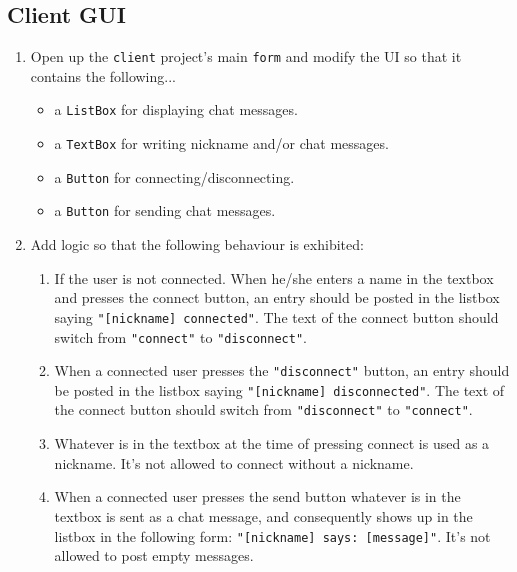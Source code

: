 \documentclass{article}
\newcounter{stepcounter}
\newenvironment{steps}{ 
  \begin{enumerate}[label=\color{red}Step \theenumi)]
    \setcounter{enumi}{\value{stepcounter}}
}{
  \setcounter{stepcounter}{\value{enumi}}
  \end{enumerate}
}
\begin{document}
\subsection{Client GUI}
 \begin{steps}
\item Open up the \texttt{client} project's main \texttt{form} and modify the UI so that it contains the following...
  \begin{itemize}
  \item a \texttt{ListBox} for displaying chat messages.
  \item a \texttt{TextBox} for writing nickname and/or chat messages.
  \item a \texttt{Button} for connecting/disconnecting.
  \item a \texttt{Button} for sending chat messages.
  \end{itemize}
\item Add logic so that the following behaviour is exhibited:
  \begin{enumerate}
  \item If the user is not connected. When he/she enters a name in the textbox and presses the connect button, an entry should be posted in the listbox saying \texttt{"[nickname] connected"}. The text of the connect button should switch from \texttt{"connect"} to \texttt{"disconnect"}.
  \item When a connected user presses the \texttt{"disconnect"} button, an entry should be posted in the listbox saying \texttt{"[nickname] disconnected"}. The text of the connect button should switch from \texttt{"disconnect"} to \texttt{"connect"}.
  \item Whatever is in the textbox at the time of pressing connect is used as a nickname. It's not allowed to connect without a nickname.
  \item When a connected user presses the send button whatever is in the textbox is sent as a chat message, and consequently shows up in the listbox in the following form: \texttt{"[nickname] says: [message]"}. It's not allowed to post empty messages.
  \end{enumerate}
\end{steps}
\end{document}
